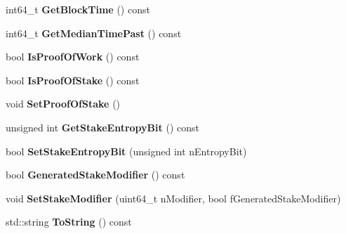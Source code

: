 \begin{DoxyCompactItemize}
\item 
\mbox{\label{class_c_block_index_a9fe0d4463c07c466f66252e8eec25f5c}} 
int64\+\_\+t {\bfseries Get\+Block\+Time} () const
\item 
\mbox{\label{class_c_block_index_aa9bd0ab02cf8b9c866618cee3a5a0583}} 
int64\+\_\+t {\bfseries Get\+Median\+Time\+Past} () const
\item 
\mbox{\label{class_c_block_index_a857e290d668b5f2e9c19cd9c6f5b3eb3}} 
bool {\bfseries Is\+Proof\+Of\+Work} () const
\item 
\mbox{\label{class_c_block_index_a2438a891e9d43821c0d99e1bdac56fde}} 
bool {\bfseries Is\+Proof\+Of\+Stake} () const
\item 
\mbox{\label{class_c_block_index_a4c1eb937c07db986f698909e66754c9e}} 
void {\bfseries Set\+Proof\+Of\+Stake} ()
\item 
\mbox{\label{class_c_block_index_a22a225e6caa79bb05f4d996cc48ca7ad}} 
unsigned int {\bfseries Get\+Stake\+Entropy\+Bit} () const
\item 
\mbox{\label{class_c_block_index_a7a161878ce10e36cf7c12004f31357cf}} 
bool {\bfseries Set\+Stake\+Entropy\+Bit} (unsigned int n\+Entropy\+Bit)
\item 
\mbox{\label{class_c_block_index_a7b629ae58cb86d49d7fb6f4f7411062d}} 
bool {\bfseries Generated\+Stake\+Modifier} () const
\item 
\mbox{\label{class_c_block_index_acc51fc41aa2b57c4f700aa09cdde92f8}} 
void {\bfseries Set\+Stake\+Modifier} (uint64\+\_\+t n\+Modifier, bool f\+Generated\+Stake\+Modifier)
\item 
\mbox{\label{class_c_block_index_a18258e956a4bc77dcccdb0db8f91effe}} 
std\+::string {\bfseries To\+String} () const
\item 
\mbox{\label{class_c_block_index_ad8b5a6560e7c0d4222066e2922178683}} 

\end{DoxyCompactItemize}

